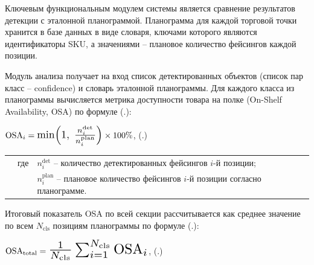 {\gostFont

	\par \redline Ключевым функциональным модулем системы является сравнение результатов детекции с эталонной планограммой.
	Планограмма для каждой торговой точки хранится в базе данных в виде словаря, ключами которого являются идентификаторы SKU, а значениями {--} плановое количество фейсингов каждой позиции.
	\par \redline Модуль анализа получает на вход список детектированных объектов (список пар класс {--} confidence) и словарь эталонной планограммы.
	Для каждого класса из планограммы вычисляется метрика доступности товара на полке (On-Shelf Availability, OSA) по формуле (\thechaptercntr .\theformulacntr):

	\formulaspace 
	\par \redline $\mathrm{OSA}_i = \scaleto{\min\!\left(1,\; \frac{n_i^{\mathrm{det}}}{n_i^{\mathrm{plan}}}\right)}{24pt} \times 100\%$,
	\hfill (\thechaptercntr .\theformulacntr) \hspace*{-0.5cm}\redline
	\formulaspace \addtocounter{formulacntr}{1}

	\begin{tabular}{p{0.875cm}p{0.3cm}p{15.175cm}}
		& где  & $n_i^{\mathrm{det}}$ {--} количество детектированных фейсингов $i$-й позиции; \\
		&      & $n_i^{\mathrm{plan}}$ {--} плановое количество фейсингов $i$-й позиции согласно планограмме. \\
	\end{tabular}
	\vspace{13pt}

	\par \redline Итоговый показатель OSA по всей секции рассчитывается как среднее значение по всем $N_{\mathrm{cls}}$ позициям планограммы по формуле (\thechaptercntr .\theformulacntr):

	\formulaspace 
	\par \redline $\mathrm{OSA}_{\mathrm{total}} = \scaleto{\frac{1}{N_{\mathrm{cls}}} \sum_{i=1}^{N_{\mathrm{cls}}} \mathrm{OSA}_i}{24pt}$,
	\hfill (\thechaptercntr .\theformulacntr) \hspace*{-0.5cm}\redline
	\formulaspace \addtocounter{formulacntr}{1}
	\vspace{13pt}

}

